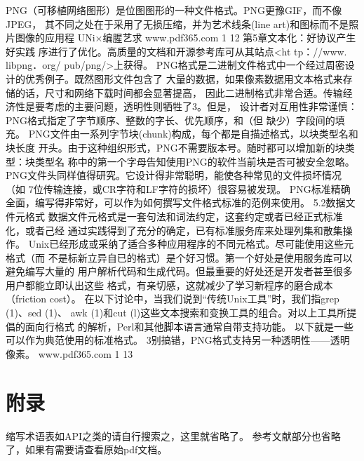 \documentclass[11pt,oneside]{book}
\begin{document}
\begin{common-format}
    PNG（可移植网络图形）是位图图形的一种文件格式。PNG更豫GIF，而不像JPEG，
其不同之处在于采用了无损压缩，并为艺术线条(line art)和图标而不是照片图像的应用程
UNi×编腥艺求
  www.pdf365.com
1 12
第5章文本化：好协议产生好实践
序进行了优化。高质量的文档和开源参考库可从其站点<ht tp：//www. libpng．org/
pub/png/>上获得。
    PNG格式是二进制文件格式中一个经过周密设计的优秀例子。既然图形文件包含了
大量的数据，如果像素数据用文本格式来存储的话，尺寸和网络下载时间都会显著提高，
因此二进制格式非常合适。传输经济性是要考虑的主要问题，透明性则牺牲了3。但是，
设计者对互用性非常谨慎：PNG格式指定了字节顺序、整数的字长、优先顺序，和（但
缺少）字段间的填充。
    PNG文件由一系列字节块(chunk)构成，每个都是自描述格式，以块类型名和块长度
开头。由于这种组织形式，PNG不需要版本号。随时都可以增加新的块类型：块类型名
称中的第一个字母告知使用PNG的软件当前块是否可被安全忽略。
    PNG文件头同样值得研究。它设计得非常聪明，能使各种常见的文件损坏情况（如
7位传输连接，或CR字符和LF字符的损坏）很容易被发现。
    PNG标准精确全面，编写得非常好，可以作为如何撰写文件格式标准的范例来使用。
5.2数据文件元格式
    数据文件元格式是一套句法和词法约定，这套约定或者已经正式标准化，或者己经
通过实践得到了充分的确定，已有标准服务库来处理列集和散集操作。
    Unix已经形成或采纳了适合多种应用程序的不同元格式。尽可能使用这些元格式（而
不是标新立异自已的格式）是个好习惯。第一个好处是使用服务库可以避免编写大量的
用户解析代码和生成代码。但最重要的好处还是开发者甚至很多用户都能立即认出这些
格式，有亲切感，这就减少了学习新程序的磨合成本（friction cost）。
    在以下讨论中，当我们说到“传统Unix工具”时，我们指grep (1)、sed (1)、
awk (1)和cut (l)这些文本搜索和变换工具的组合。对以上工具所提倡的面向行格式
的解析，Perl和其他脚本语言通常自带支持功能。
以下就是一些可以作为典范使用的标准格式。
3别搞错，PNG格式支持另一种透明性——透明像素。
www.pdf365.com
1 13













\chapter{附录}
缩写术语表如API之类的请自行搜索之，这里就省略了。
参考文献部分也省略了，如果有需要请查看原始pdf文档。


\end{common-format}  
\end{document}
